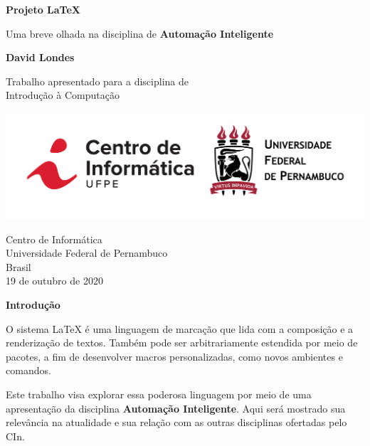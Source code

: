 \documentclass[a4paper,12pt]{article}
\begin{document}
\begin{titlepage}
    \begin{center}
    		{
        \vspace*{0.5 cm}
            
        \Huge
        \textbf{Projeto LaTeX}
            
        \vspace{0.5cm}
        \LARGE
        Uma breve olhada na disciplina de \textbf{Automação Inteligente}
            
        \vspace{1.5cm}
            
        \textbf{David Londes}
            
        \vfill
            
        Trabalho apresentado para a disciplina de\\
        Introdução à Computação
            
        \vspace{0.8cm}
            
        \includegraphics[scale=0.3]{cinufpe}
            
        \Large
        Centro de Informática\\
        Universidade Federal de Pernambuco\\
        Brasil\\
        19 de outubro de 2020
            }
    \end{center}
\end{titlepage}



	\begin{center}
		\LARGE
		\textbf{Introdução}
	\end{center}
	\vspace*{0.5 cm}
	\par 
		O sistema LaTeX é uma linguagem de marcação que lida com a composição e a renderização de textos. Também pode ser arbitrariamente estendida por meio de pacotes, a fim de desenvolver macros personalizadas, como novos ambientes e comandos.
	\par
		Este trabalho visa explorar essa poderosa linguagem por meio de uma apresentação da disciplina \textbf{Automação Inteligente}. Aqui será mostrado sua relevância na atualidade e sua relação com as outras disciplinas ofertadas pelo CIn.
		
\end{document}
